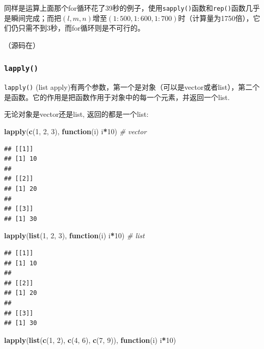 \documentclass[]{book}
\newenvironment{Shaded}{\begin{snugshade}}{\end{snugshade}}
\newcommand{\CommentTok}[1]{\textcolor[rgb]{0.56,0.35,0.01}{\textit{#1}}}
\newcommand{\ControlFlowTok}[1]{\textcolor[rgb]{0.13,0.29,0.53}{\textbf{#1}}}
\newcommand{\DecValTok}[1]{\textcolor[rgb]{0.00,0.00,0.81}{#1}}
\newcommand{\KeywordTok}[1]{\textcolor[rgb]{0.13,0.29,0.53}{\textbf{#1}}}
\newcommand{\NormalTok}[1]{#1}
\newcommand{\OperatorTok}[1]{\textcolor[rgb]{0.81,0.36,0.00}{\textbf{#1}}}
\begin{document}
同样是运算上面那个for循环花了39秒的例子，使用\texttt{sapply()}函数和\texttt{rep()}函数几乎是瞬间完成；而把\((l,m,n)\)增至\((1:500,1:600,1:700)\)时（计算量为1750倍），它们仍只需不到3秒，而for循环则是不可行的。

（源码在）

\hypertarget{lapply}{%
\subsubsection{\texorpdfstring{\texttt{lapply()}}{lapply()}}\label{lapply}}

\texttt{lapply()} (list apply)有两个参数，第一个是对象（可以是vector或者list），第二个是函数。它的作用是把函数作用于对象中的每一个元素，并返回一个list.

无论对象是vector还是list, 返回的都是一个list:

\begin{Shaded}
\begin{Highlighting}[]
\KeywordTok{lapply}\NormalTok{(}\KeywordTok{c}\NormalTok{(}\DecValTok{1}\NormalTok{, }\DecValTok{2}\NormalTok{, }\DecValTok{3}\NormalTok{), }\ControlFlowTok{function}\NormalTok{(i) i}\OperatorTok{*}\DecValTok{10}\NormalTok{) }\CommentTok{# vector}
\end{Highlighting}
\end{Shaded}

\begin{verbatim}
## [[1]]
## [1] 10
## 
## [[2]]
## [1] 20
## 
## [[3]]
## [1] 30
\end{verbatim}

\begin{Shaded}
\begin{Highlighting}[]
\KeywordTok{lapply}\NormalTok{(}\KeywordTok{list}\NormalTok{(}\DecValTok{1}\NormalTok{, }\DecValTok{2}\NormalTok{, }\DecValTok{3}\NormalTok{), }\ControlFlowTok{function}\NormalTok{(i) i}\OperatorTok{*}\DecValTok{10}\NormalTok{) }\CommentTok{# list}
\end{Highlighting}
\end{Shaded}

\begin{verbatim}
## [[1]]
## [1] 10
## 
## [[2]]
## [1] 20
## 
## [[3]]
## [1] 30
\end{verbatim}

\begin{Shaded}
\begin{Highlighting}[]
\KeywordTok{lapply}\NormalTok{(}\KeywordTok{list}\NormalTok{(}\KeywordTok{c}\NormalTok{(}\DecValTok{1}\NormalTok{, }\DecValTok{2}\NormalTok{), }\KeywordTok{c}\NormalTok{(}\DecValTok{4}\NormalTok{, }\DecValTok{6}\NormalTok{), }\KeywordTok{c}\NormalTok{(}\DecValTok{7}\NormalTok{, }\DecValTok{9}\NormalTok{)), }\ControlFlowTok{function}\NormalTok{(i) i}\OperatorTok{*}\DecValTok{10}\NormalTok{)}
\end{Highlighting}
\end{Shaded}
\end{document}
